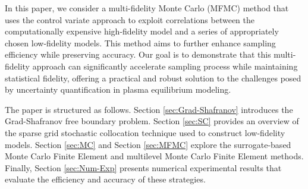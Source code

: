 \documentclass[final,3p,times,11pt]{elsarticle}
\begin{document}
In this paper, we consider a multi-fidelity Monte Carlo (MFMC) method that uses the control variate approach to exploit correlations between the computationally expensive high-fidelity model and a series of appropriately chosen low-fidelity models. This method aims to further enhance sampling efficiency while preserving accuracy. Our goal is to demonstrate that this multi-fidelity approach can significantly accelerate sampling process while maintaining statistical fidelity, offering a practical and robust solution to the challenges posed by uncertainty quantification in plasma equilibrium modeling.


The paper is structured as follows. Section \ref{sec:Grad-Shafranov} introduces the Grad-Shafranov free boundary problem.  Section \ref{sec:SC} provides an overview of the sparse grid stochastic collocation technique used to construct low-fidelity models. Section \ref{sec:MC} and Section \ref{sec:MFMC} explore the surrogate-based Monte Carlo Finite Element and multilevel Monte Carlo Finite Element methods. Finally, Section \ref{sec:Num-Exp} presents numerical experimental results that evaluate the efficiency and accuracy of these strategies.



\end{document}
